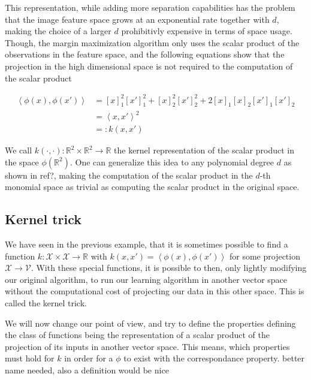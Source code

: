 This representation, while adding more separation capabilities has the problem that the image feature space grows at an exponential rate together with $d$, making the choice of a larger $d$ prohibitivly expensive in terms of space usage. Though, the margin maximization algorithm only uses the scalar product of the observations in the feature space, and the following equations show that the projection in the high dimensional space is not required to the computation of the scalar product

\begin{equation*}
  \begin{aligned}
    \left<\phi(x), \phi(x')\right>
    &= [x]_1^2[x']_1^2 + [x]_2^2[x']_2^2 + 2[x]_1[x]_2[x']_1[x']_2\\
    &= \left<x, x'\right>^2 \\
    &=: k(x, x')
  \end{aligned}
\end{equation*}

We call $k(\cdot, \cdot) : \mathbb{R}^2 \times \mathbb{R}^2 \rightarrow \mathbb{R}$ the kernel representation of the scalar product in the space $\phi(\mathbb{R}^2)$. One can generalize this idea to any polynomial degree $d$ as shown in \textcolor[rgb]{1,0,0}{ref?}, making the computation of the scalar product in the $d$-th monomial space as trivial as computing the scalar product in the original space.

\subsection{Kernel trick}

We have seen in the previous example, that it is sometimes possible to find a function $k :\mathcal{X} \times \mathcal{X} \rightarrow \mathbb{R}$ with $k(x, x') = \left<\phi(x), \phi(x')\right>$ for some projection $\mathcal{X} \rightarrow \mathcal{V}$. With these special functions, it is possible to then, only lightly modifying our original algorithm, to run our learning algorithm in another vector space without the computational cost of projecting our data in this other space. This is called the kernel trick.

We will now change our point of view, and try to define the properties defining the class of functions being the representation of a scalar product of the projection of its inputs in another vector space. This means, which properties must hold for $k$ in order for a $\phi$ to exist with the correspondance property. \textcolor[rgb]{1,0,0}{better name needed, also a definition would be nice} 

